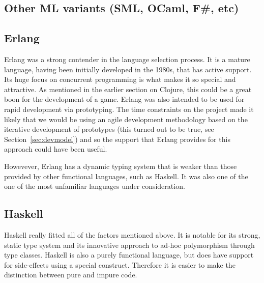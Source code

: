
\subsection{Other ML variants (SML, OCaml, F\#, etc)}



\subsection{Erlang}



Erlang was a strong contender in the language selection process. It is a mature language, having been initially developed in the 1980s, that has active support. Its huge focus on concurrent programming is what makes it so special and attractive. As mentioned in the earlier section on Clojure, this could be a great boon for the development of a game. Erlang was also intended to be used for rapid development via prototyping. The time constraints on the project made it likely that we would be using an agile development methodology based on the iterative development of prototypes (this turned out to be true, see Section~\ref{sec:devmodel}) and so the support that Erlang provides for this approach could have been useful.

Howevever, Erlang has a dynamic typing system that is weaker than those provided by other functional languages, such as Haskell. It was also one of the one of the most unfamiliar languages under consideration.

\subsection{Haskell}


Haskell really fitted all of the factors mentioned above. It is notable for its strong, static type system and its innovative approach to ad-hoc polymorphism through type classes.\cite{wadler1989typeclasses} Haskell is also a purely functional language, but does have support for side-effects using a special construct. Therefore it is easier to make the distinction between pure and impure code.

